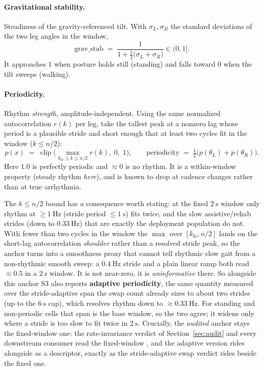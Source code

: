 \documentclass[11pt]{article}
\newcommand{\Lang}{\theta_{L}}          %
\newcommand{\Rang}{\theta_{R}}          %
\begin{document}
\paragraph{Gravitational stability.} Steadiness of the gravity-referenced tilt. With
$\sigma_L, \sigma_R$ the standard deviations of the two leg angles in the window,
\begin{equation}
\text{grav\_stab} \;=\; \frac{1}{1 + \tfrac{1}{2}\big(\sigma_L + \sigma_R\big)} \in (0, 1].
\end{equation}
It approaches $1$ when posture holds still (standing) and falls toward $0$ when the tilt
sweeps (walking).

\paragraph{Periodicity.} Rhythm \emph{strength}, amplitude-independent. Using the same
normalized autocorrelation $r(k)$ per leg, take the tallest peak at a nonzero lag whose
period is a plausible stride and short enough that at least two cycles fit in the window
($k \leq n/2$):
\begin{equation}
p(x) \;=\; \operatorname{clip}\!\Big(\max_{k_\text{lo} \leq k \leq n/2} r(k),\; 0,\; 1\Big),
\qquad
\text{periodicity} \;=\; \tfrac{1}{2}\big(p(\Lang) + p(\Rang)\big).
\end{equation}
Here $1.0$ is perfectly periodic and $\approx 0$ is no rhythm. It is a within-window
property (steady rhythm \emph{here}), and is known to drop at cadence changes rather than
at true arrhythmia.

The $k \leq n/2$ bound has a consequence worth stating: at the fixed $2~\text{s}$ window
only rhythm at $\geq 1~\text{Hz}$ (stride period $\leq 1~\text{s}$) fits twice, and the slow
assistive/rehab strides (down to $0.33~\text{Hz}$) that are exactly the deployment population
do not. With fewer than two cycles in the window the $\max$ over $[k_\text{lo}, n/2]$ lands on
the short-lag autocorrelation \emph{shoulder} rather than a resolved stride peak, so the anchor
turns into a smoothness proxy that cannot tell rhythmic slow gait from a non-rhythmic smooth
sweep: a $0.4~\text{Hz}$ stride and a plain linear ramp both read $\approx 0.5$ in a
$2~\text{s}$ window. It is not near-zero, it is \emph{uninformative} there. So alongside this
anchor S3 also
reports \textbf{adaptive periodicity}, the same quantity measured over the stride-adaptive
span the swap count already sizes to about two strides (up to the $6~\text{s}$ cap), which
resolves rhythm down to $\approx 0.33~\text{Hz}$.
For standing and non-periodic cells that span is the base window, so the two agree; it
widens only where a stride is too slow to fit twice in $2~\text{s}$. Crucially, the
\emph{audited} anchor stays the fixed-window one: the rate-invariance verdict of
Section~\ref{sec:audit} and every downstream consumer read the fixed-window
, and the adaptive version rides alongside as a descriptor, exactly as
the stride-adaptive swap verdict rides beside the fixed one.
\end{document}
